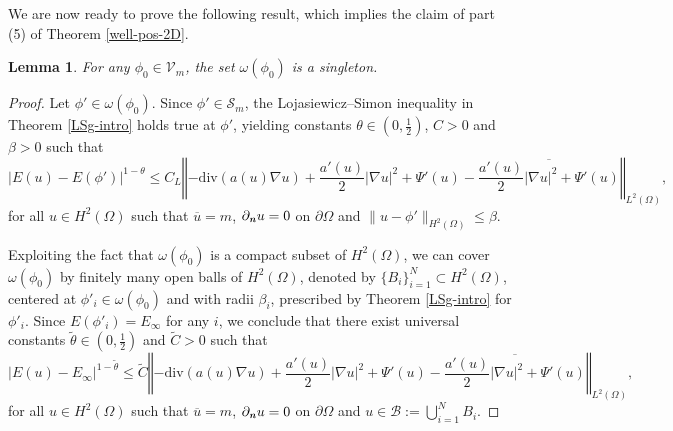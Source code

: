 \documentclass[11pt,reqno]{amsart}
\newtheorem{lemma}[theorem]{Lemma}
\theoremstyle{remark}
\newcommand \norm[1] {\left\Vert #1\right\Vert}
\def\n{\textbf{\textit{n}}}
\def\div{\mathrm{div}}
\numberwithin{equation}{section}
\begin{document}
\medskip
We are now ready to prove the following result, which implies the claim of part (5) of Theorem \ref{well-pos-2D}. 

\begin{lemma}
For any $\phi_0\in \mathcal{V}_m$, the set $\omega(\phi_0)$ is a singleton.
\end{lemma}

\begin{proof}
Let $\phi'\in \omega(\phi_0)$. Since $\phi'\in \mathcal{S}_m$, the Lojasiewicz--Simon inequality in Theorem \ref{LSg-intro} holds true at $\phi'$, yielding
 constants $\theta\in \left(0, \frac12\right)$, $C>0$ and
$\beta >0$ such that 
\begin{equation*}
\label{Ls-1}
|E(u) -E(\phi')|^{1-\theta}\leq C_L \norm{-\div(a(u)\nabla u)+\frac{a'(u)}{2} |\nabla u|^2+\Psi'(u)-\overline{\frac{a'(u)}{2} |\nabla u|^2+\Psi'(u)}}_{L^2(\Omega)},
\end{equation*}
for all $u\in H^2(\Omega)$ such that $\overline{u}=m$, $\partial_\n u=0$ on $\partial\Omega$ and $\|u-\phi'\|_{H^2(\Omega)}\leq \beta$.

\medskip
\noindent
Exploiting the fact that $\omega(\phi_0)$ is a compact subset of $H^2(\Omega)$, we can cover $\omega(\phi_0)$ by finitely many open balls of $H^2(\Omega)$, denoted by $\lbrace B_i \rbrace_{i=1}^N\subset H^2(\Omega)$, centered at $\phi'_i \in \omega(\phi_0)$ and with radii $\beta_i$,
prescribed by Theorem \ref{LSg-intro} for $\phi'_i$.  Since $E(\phi'_i)=E_\infty$ for any $i$,
we conclude that there exist universal constants $\widetilde{\theta} \in \left(0,\frac12\right)$ and $\widetilde{C}>0$ such that
\begin{equation}
\label{Simon}
|E(u) -E_\infty|^{1-\widetilde{\theta}}\leq \widetilde{C} \norm{-\div(a(u)\nabla u)+\frac{a'(u)}{2} |\nabla u|^2+\Psi'(u)-\overline{\frac{a'(u)}{2} |\nabla u|^2+\Psi'(u)}}_{L^2(\Omega)},
\end{equation}
for all $u\in H^2(\Omega)$ such that $\overline{u}=m$, $\partial_\n u=0$ on $\partial\Omega$ and $u\in \mathcal{B}:= \bigcup_{i=1}^N B_i$.


\end{proof}
\end{document}
